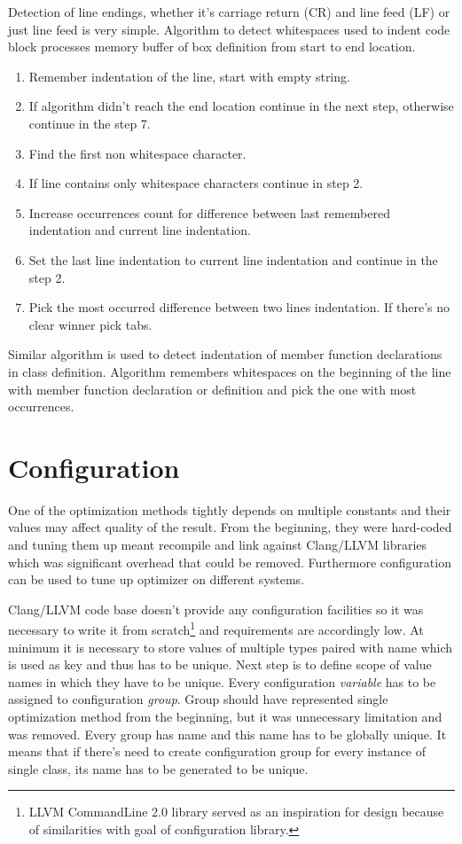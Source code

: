 Detection of line endings, whether it's carriage return (CR) and line feed (LF) or just line feed is very simple. Algorithm to detect whitespaces used to indent code block processes memory buffer of box definition from start to end location.

\begin{enumerate}
\item{Remember indentation of the line, start with empty string.}
\item{If algorithm didn't reach the end location continue in the next step, otherwise continue in the step 7.}
\item{Find the first non whitespace character.}
\item{If line contains only whitespace characters continue in step 2.}
\item{Increase occurrences count for difference between last remembered indentation and current line indentation.}
\item{Set the last line indentation to current line indentation and continue in the step 2.}
\item{Pick the most occurred difference between two lines indentation. If there's no clear winner pick tabs.}
\end{enumerate}

Similar algorithm is used to detect indentation of member function declarations in class definition. Algorithm remembers whitespaces on the beginning of the line with member function declaration or definition and pick the one with most occurrences.

\section{Configuration}
\label{opt-configuration}
One of the optimization methods tightly depends on multiple constants and their values may affect quality of the result. From the beginning, they were hard-coded and tuning them up meant recompile and link against Clang/LLVM libraries which was significant overhead that could be removed. Furthermore configuration can be used to tune up optimizer on different systems.

Clang/LLVM code base doesn't provide any configuration facilities so it was necessary to write it from scratch\footnote{LLVM CommandLine 2.0 library served as an inspiration for design because of similarities with goal of configuration library.} and requirements are accordingly low. At minimum it is necessary to store values of multiple types paired with name which is used as key and thus has to be unique. Next step is to define scope of value names in which they have to be unique. Every configuration \emph{variable} has to be assigned to configuration \emph{group}. Group should have represented single optimization method from the beginning, but it was unnecessary limitation and was removed. Every group has name and this name has to be globally unique. It means that if there's need to create configuration group for every instance of single class, its name has to be generated to be unique.

